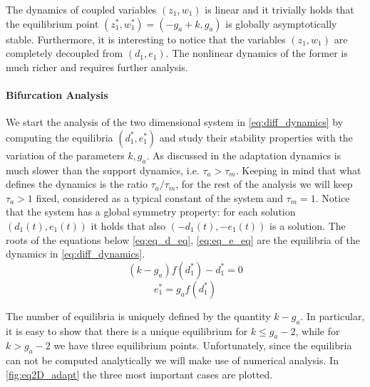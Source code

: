 The dynamics of coupled variables $(z_1, w_1)$ is linear and it trivially holds that the equilibrium point $(z_1^*,w_1^*)=(-g_a+k, g_a)$ is globally asymptotically stable. Furthermore, it is interesting to notice that the variables  $(z_1, w_1)$ are completely decoupled from $(d_1, e_1)$. The nonlinear dynamics of the former is much richer and requires further analysis. 

\paragraph{Bifurcation Analysis}
We start the analysis of the two dimensional system in \cref{eq:diff_dynamics} by computing the equilibria $(d_1^*,e_1^*)$ and study their stability properties with the variation of the parameters $k, g_a$. As discussed in \cite{LansnerFRC} the adaptation dynamics is much slower than the support dynamics, i.e. $\tau_a > \tau_m$. Keeping in mind that what defines the dynamics is the ratio $\tau_a/\tau_m$, for the rest of the analysis we will keep $\tau_a>1$ fixed, considered as a typical constant of the system and $\tau_m=1$. Notice that the system has a global symmetry property: for each solution $(d_1(t), e_1(t))$ it holds that also $(-d_1(t), -e_1(t))$ is a solution. The roots of the equations below \eqref{eq:eq_d_eq}, \eqref{eq:eq_e_eq} are the equilibria of the dynamics in \eqref{eq:diff_dynamics}.
\begin{equation}
 (k - g_a)f(d_1^*) - d_1^* = 0
\label{eq:eq_d_eq}
\end{equation}
\begin{equation}
e_1^* = g_a f(d_1^*)
\label{eq:eq_e_eq}
\end{equation}

The number of equilibria is uniquely defined by the quantity $k-g_a$. In particular, it is easy to show that there is a unique equilibrium for $k \leq g_a-2$, while for $k > g_a-2$ we have three equilibrium points. Unfortunately, since the equilibria can not be computed analytically we will make use of numerical analysis. In \cref{fig:eq2D_adapt} the three most important cases are plotted.

